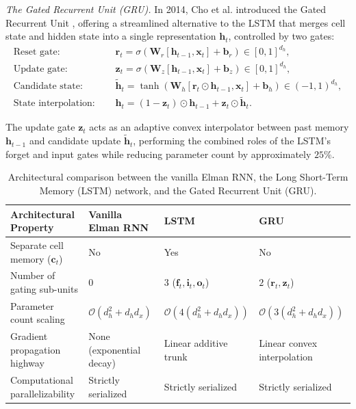 \documentclass[../../../main.tex]{subfiles}
\begin{document}
\textit{The Gated Recurrent Unit (GRU).} In 2014, Cho et al. introduced the Gated Recurrent Unit \citep{cho2014}, offering a streamlined alternative to the LSTM that merges cell state and hidden state into a single representation $\mathbf{h}_t$, controlled by two gates:
\begin{align}
\text{Reset gate: } & \quad \mathbf{r}_t = \sigma\left(\mathbf{W}_r \left[\mathbf{h}_{t-1}, \mathbf{x}_t\right] + \mathbf{b}_r\right) \in [0, 1]^{d_h}, \label{eq:gru_reset_gate} \\
\text{Update gate: } & \quad \mathbf{z}_t = \sigma\left(\mathbf{W}_z \left[\mathbf{h}_{t-1}, \mathbf{x}_t\right] + \mathbf{b}_z\right) \in [0, 1]^{d_h}, \label{eq:gru_update_gate} \\
\text{Candidate state: } & \quad \tilde{\mathbf{h}}_t = \tanh\left(\mathbf{W}_h \left[\mathbf{r}_t \odot \mathbf{h}_{t-1}, \mathbf{x}_t\right] + \mathbf{b}_h\right) \in (-1, 1)^{d_h}, \label{eq:gru_candidate} \\
\text{State interpolation: } & \quad \mathbf{h}_t = \left(1 - \mathbf{z}_t\right) \odot \mathbf{h}_{t-1} + \mathbf{z}_t \odot \tilde{\mathbf{h}}_t. \label{eq:gru_update}
\end{align}

The update gate $\mathbf{z}_t$ acts as an adaptive convex interpolator between past memory $\mathbf{h}_{t-1}$ and candidate update $\tilde{\mathbf{h}}_t$, performing the combined roles of the LSTM's forget and input gates while reducing parameter count by approximately $25\%$.

\begin{table}[htbp]
\centering
\small
\begin{tabularx}{\textwidth}{l X X X}
\toprule
\textbf{Architectural Property} & \textbf{Vanilla Elman RNN} & \textbf{LSTM} & \textbf{GRU} \\
\midrule
Separate cell memory ($\mathbf{c}_t$) & No & Yes & No \\
Number of gating sub-units & $0$ & $3$ ($\mathbf{f}_t, \mathbf{i}_t, \mathbf{o}_t$) & $2$ ($\mathbf{r}_t, \mathbf{z}_t$) \\
Parameter count scaling & $\mathcal{O}\left(d_h^2 + d_h d_x\right)$ & $\mathcal{O}\left(4(d_h^2 + d_h d_x)\right)$ & $\mathcal{O}\left(3(d_h^2 + d_h d_x)\right)$ \\
Gradient propagation highway & None (exponential decay) & Linear additive trunk & Linear convex interpolation \\
Computational parallelizability & Strictly serialized & Strictly serialized & Strictly serialized \\
\bottomrule
\end{tabularx}
\caption{Architectural comparison between the vanilla Elman RNN, the Long Short-Term Memory (LSTM) network, and the Gated Recurrent Unit (GRU).}
\label{tab:rnn_architectures_comparison}
\end{table}
\end{document}
